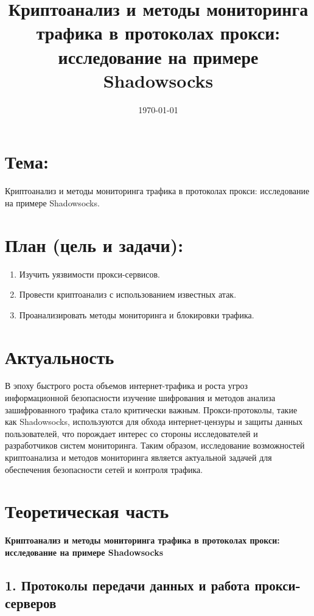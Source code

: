 \documentclass[a4paper,12pt]{article}
\begin{document}
\title{Криптоанализ и методы мониторинга трафика в протоколах прокси: исследование на примере Shadowsocks}
\date{\today}
\maketitle

\section*{Тема:}

Криптоанализ и методы мониторинга трафика в протоколах прокси: исследование на примере Shadowsocks.

\section*{План (цель и задачи):}

\begin{enumerate}
    \item Изучить уязвимости прокси-сервисов.
    \item Провести криптоанализ с использованием известных атак.
    \item Проанализировать методы мониторинга и блокировки трафика.
\end{enumerate}

\section*{Актуальность}

В эпоху быстрого роста объемов интернет-трафика и роста угроз информационной безопасности изучение шифрования и методов анализа зашифрованного трафика стало критически важным. Прокси-протоколы, такие как Shadowsocks, используются для обхода интернет-цензуры и защиты данных пользователей, что порождает интерес со стороны исследователей и разработчиков систем мониторинга. Таким образом, исследование возможностей криптоанализа и методов мониторинга является актуальной задачей для обеспечения безопасности сетей и контроля трафика.

\newpage

\section*{Теоретическая часть}
\textbf{Криптоанализ и методы мониторинга трафика в протоколах прокси: исследование на примере Shadowsocks}

\subsection*{1. Протоколы передачи данных и работа прокси-серверов}
\end{document}
